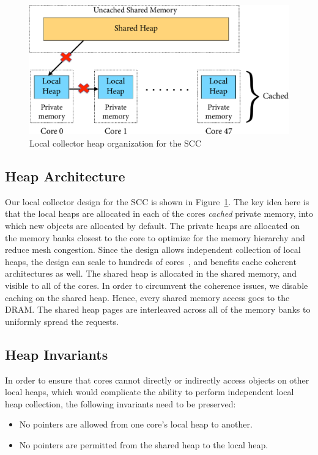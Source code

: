 \begin{figure}
\centering
\includegraphics[scale=0.75]{Figures/LocalCollector.pdf}
\caption{Local collector heap organization for the SCC}
\label{fig:lc}
\end{figure}

\subsection{Heap Architecture}

Our local collector design for the SCC is shown in Figure~\ref{fig:lc}. The key
idea here is that the local heaps are allocated in each of the cores
\emph{cached} private memory, into which new objects are allocated by default.
The private heaps are allocated on the memory banks closest to the core to
optimize for the memory hierarchy and reduce mesh congestion. Since the design
allows independent collection of local heaps, the design can scale to hundreds
of cores~\cite{JFP14}, and benefits cache coherent architectures as well. The
shared heap is allocated in the shared memory, and visible to all of the cores.
In order to circumvent the coherence issues, we disable caching on the shared
heap. Hence, every shared memory access goes to the DRAM. The shared heap pages
are interleaved across all of the memory banks to uniformly spread the
requests.

\subsection{Heap Invariants}

In order to ensure that cores cannot directly or indirectly access objects on
other local heaps, which would complicate the ability to perform independent
local heap collection, the following invariants need to be preserved:

\begin{itemize}
\item No pointers are allowed from one core's local heap to another.
\item No pointers are permitted from the shared heap to the local heap.
\end{itemize}

